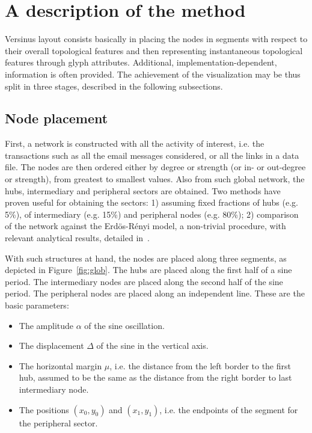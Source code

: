 \documentclass[runningheads]{llncs}
\begin{document}
\section{A description of the method}\label{sec:des}
Versinus layout consists basically in placing the nodes in segments
with respect to their overall topological features and then representing
instantaneous topological features through glyph attributes.
Additional, implementation-dependent, information is often provided.
The achievement of the visualization may be thus split in three stages,
described in the following subsections.

\subsection{Node placement}\label{sec:pla}
First, a network is constructed with all the activity of interest, i.e. the transactions such as all the email messages considered, or all the links in a data file.
The nodes are then ordered either by degree or strength (or in- or out-degree or strength), from greatest to smallest values.
Also from such global network, the hubs, intermediary and peripheral sectors are obtained. Two methods have proven useful for obtaining the sectors: 1) assuming fixed fractions of hubs (e.g. 5\%), of intermediary (e.g. 15\%) and peripheral nodes (e.g. 80\%); 2) comparison of the network against the Erdös-Rényi model, a non-trivial procedure, with relevant analytical results, detailed in~\cite{stab}.

With such structures at hand, the nodes are placed along three segments, as depicted in Figure~\ref{fig:glob}.
The hubs are placed along the first half of a sine period.
The intermediary nodes are placed along the second half of the sine period.
The peripheral nodes are placed along an independent line.
These are the basic parameters:
\begin{itemize}
  \item The amplitude $\alpha$ of the sine oscillation.
  \item The displacement $\Delta$ of the sine in the vertical axis.
  \item The horizontal margin $\mu$, i.e. the distance from the left border to the first hub, assumed to be the same as the distance from the right border to last intermediary node.
  \item The positions $(x_0,y_0)$ and $(x_1,y_1)$, i.e. the endpoints of the segment for the peripheral sector.
\end{itemize}
\end{document}
